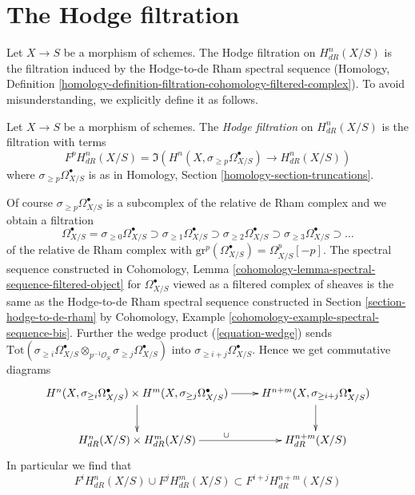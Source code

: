 \section{The Hodge filtration}
\label{section-hodge-filtration}

\noindent
Let $X \to S$ be a morphism of schemes. The Hodge filtration on $H^n_{dR}(X/S)$
is the filtration induced by the Hodge-to-de Rham spectral sequence
(Homology, Definition
\ref{homology-definition-filtration-cohomology-filtered-complex}).
To avoid misunderstanding, we explicitly define it as follows.

\begin{definition}
\label{definition-hodge-filtration}
Let $X \to S$ be a morphism of schemes. The {\it Hodge filtration}
on $H^n_{dR}(X/S)$ is the filtration with terms
$$
F^pH^n_{dR}(X/S) = \Im\left(H^n(X, \sigma_{\geq p}\Omega^\bullet_{X/S})
\longrightarrow H^n_{dR}(X/S)\right)
$$
where $\sigma_{\geq p}\Omega^\bullet_{X/S}$ is as in
Homology, Section \ref{homology-section-truncations}.
\end{definition}

\noindent
Of course $\sigma_{\geq p}\Omega^\bullet_{X/S}$ is a subcomplex of
the relative de Rham complex and we obtain a filtration
$$
\Omega^\bullet_{X/S} = \sigma_{\geq 0}\Omega^\bullet_{X/S} \supset
\sigma_{\geq 1}\Omega^\bullet_{X/S} \supset
\sigma_{\geq 2}\Omega^\bullet_{X/S} \supset
\sigma_{\geq 3}\Omega^\bullet_{X/S} \supset \ldots
$$
of the relative de Rham complex with
$\text{gr}^p(\Omega^\bullet_{X/S}) = \Omega^p_{X/S}[-p]$.
The spectral sequence constructed in
Cohomology, Lemma \ref{cohomology-lemma-spectral-sequence-filtered-object}
for $\Omega^\bullet_{X/S}$ viewed as a filtered complex of sheaves
is the same as the Hodge-to-de Rham spectral sequence constructed in
Section \ref{section-hodge-to-de-rham} by
Cohomology, Example \ref{cohomology-example-spectral-sequence-bis}. Further the
wedge product (\ref{equation-wedge}) sends
$\text{Tot}(\sigma_{\geq i}\Omega^\bullet_{X/S} \otimes_{p^{-1}\mathcal{O}_S}
\sigma_{\geq j}\Omega^\bullet_{X/S})$ into
$\sigma_{\geq i + j}\Omega^\bullet_{X/S}$. Hence we get
commutative diagrams
$$
\xymatrix{
H^n(X, \sigma_{\geq i}\Omega^\bullet_{X/S})
\times 
H^m(X, \sigma_{\geq j}\Omega^\bullet_{X/S})
\ar[r] \ar[d] &
H^{n + m}(X, \sigma_{\geq i + j}\Omega^\bullet_{X/S}) \ar[d] \\
H^n_{dR}(X/S) \times
H^m_{dR}(X/S)
\ar[r]^\cup &
H^{n + m}_{dR}(X/S)
}
$$
In particular we find that
$$
F^iH^n_{dR}(X/S) \cup F^jH^m_{dR}(X/S) \subset F^{i + j}H^{n + m}_{dR}(X/S)
$$







